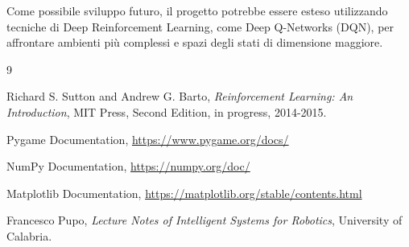 \documentclass[12pt,a4paper]{report}
\begin{document}
Come possibile sviluppo futuro, il progetto potrebbe essere esteso utilizzando tecniche di Deep Reinforcement Learning, come Deep Q-Networks (DQN), per affrontare ambienti più complessi e spazi degli stati di dimensione maggiore.


\begin{thebibliography}{9}

Richard S. Sutton and Andrew G. Barto,
\textit{Reinforcement Learning: An Introduction},
MIT Press, Second Edition, in progress, 2014-2015.

Pygame Documentation,
\url{https://www.pygame.org/docs/}

NumPy Documentation,
\url{https://numpy.org/doc/}

Matplotlib Documentation,
\url{https://matplotlib.org/stable/contents.html}

Francesco Pupo,
\textit{Lecture Notes of Intelligent Systems for Robotics},
University of Calabria.

\end{thebibliography}
\end{document}
